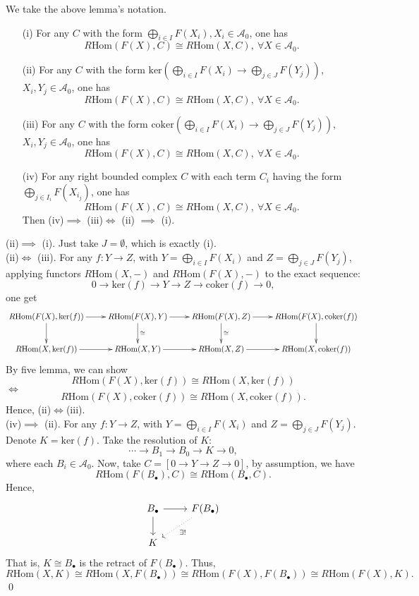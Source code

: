 \documentclass[UTF8,12,a4paper]{ctexart}
\theoremstyle{definition}
\begin{document}
\lem We take the above lemma's notation.
\begin{itemize}
	\item [(i)] For any $C$ with the form $\bigoplus_{i\in I} F(X_i),  X_i\in\mathcal{A}_0$, one has
	$$
	R\text{Hom}(F(X),C)\cong R\text{Hom}(X,C),\ \forall X\in\mathcal{A}_0.
	$$
	\item [(ii)]For any $C$ with the form $\text{ker}(\bigoplus_{i\in I} F(X_i)\rightarrow \bigoplus_{j\in J} F(Y_j))$, $X_i, Y_j\in \mathcal{A}_0$, one has
	$$
		R\text{Hom}(F(X),C)\cong R\text{Hom}(X,C),\ \forall X\in\mathcal{A}_0.
	$$
	\item [(iii)]
	For any $C$ with the form $\text{coker}(\bigoplus_{i\in I} F(X_i)\rightarrow \bigoplus_{j\in J} F(Y_j))$, $X_i, Y_j\in \mathcal{A}_0$, one has
	$$
	R\text{Hom}(F(X),C)\cong R\text{Hom}(X,C),\ \forall X\in\mathcal{A}_0.
	$$
	\item [(iv)] For any right bounded complex $C$ with each term $C_i$ having the form $\bigoplus_{j\in I_i} F(X_{i_j})$, one has
	$$
	R\text{Hom}(F(X),C)\cong R\text{Hom}(X,C),\ \forall X\in\mathcal{A}_0.
	$$
	Then (iv)$\implies$ (iii)$\iff$ (ii) $\implies$ (i).
\end{itemize}
\pf
(ii)$\implies$ (i). Just take $J=\emptyset$, which is exactly (i).\\
(ii)$\iff$ (iii). For any $f: Y\rightarrow Z$, with $Y=\bigoplus_{i\in I} F(X_i)$ and $Z=\bigoplus_{j\in J} F(Y_j)$, applying functors $R\text{Hom}(X,-)$ and $R\text{Hom}(F(X),-)$ to the exact sequence:
$$
0\rightarrow \text{ker}(f)\rightarrow Y\rightarrow Z\rightarrow \text{coker}(f)\rightarrow 0,
$$
one get 
\begin{equation*}
\xymatrix{
	R\text{Hom}(F(X),\text{ker}(f)) \ar[r]\ar[d] &R\text{Hom}(F(X),Y)\ar[d]^\cong\ar[r]&R\text{Hom}(F(X),Z)\ar[d]^\cong\ar[r]&R\text{Hom}(F(X),\text{coker}(f))\ar[d] \\
	R\text{Hom}(X,\text{ker}(f))\ar[r] &R\text{Hom}(X,Y)\ar[r]&R\text{Hom}(X,Z)\ar[r]&R\text{Hom}(X,\text{coker}(f))
}
\end{equation*}
By five lemma, we can show 
$$
R\text{Hom}(F(X),\text{ker}(f))\cong R\text{Hom}(X,\text{ker}(f))
$$
$\iff$
$$
R\text{Hom}(F(X),\text{coker}(f))\cong R\text{Hom}(X,\text{coker}(f)).
$$
Hence, (ii)$\iff$(iii).\\
(iv)$\implies$ (ii). For any $f: Y\rightarrow Z$, with $Y=\bigoplus_{i\in I} F(X_i)$ and $Z=\bigoplus_{j\in J} F(Y_j)$. Denote $K=\text{ker}(f)$. Take the resolution of $K$:
$$
\cdots\rightarrow B_1\rightarrow B_0\rightarrow K\rightarrow 0,
$$
where each $B_i\in\mathcal{A}_0$. Now, take $C=[0\rightarrow Y\rightarrow Z\rightarrow 0]$, by assumption, we have
$$
R\text{Hom}(F(B_{\bullet}),C)\cong R\text{Hom}(B_{\bullet},C).
$$
Hence,
$$
\begin{tikzcd}
B_{\bullet} \arrow[d] \arrow[r] & F(B_{\bullet}) \arrow[ld, "\exists !", dotted] \\
K                               &                                               
\end{tikzcd}
$$
That is, $K\cong B_\bullet$ is the retract of $F(B_\bullet).$
Thus, 
$$
R\text{Hom}(X,K)\cong R\text{Hom}(X,F(B_\bullet))\cong R\text{Hom}(F(X),F(B_\bullet))\cong R\text{Hom}(F(X),K).
$$
\qed
\end{document}

